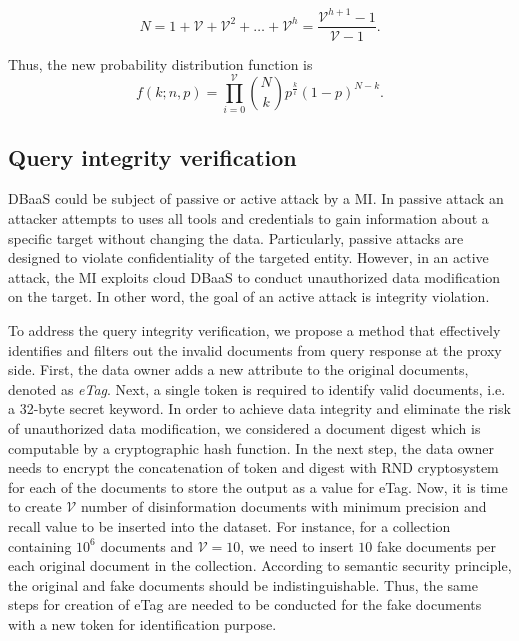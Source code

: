 \begin{equation}
\label{numberOfNodes}
N = 1+\mathcal{V}+ \mathcal{V}^2+ \dots + \mathcal{V}^h= \frac{\mathcal{V}^{h+1}-1}{\mathcal{V}-1}.
\end{equation}

Thus, the new probability distribution function is
\begin{equation}
\label{attibutesFromDilutedDB}
f(k;n,p) = \prod_{i=0}^{\mathcal{V}} {{N} \choose {k}}p^{\frac{k}{i}}(1-p)^{N-k}.
\end{equation}

\subsection{Query integrity verification}
\label{QueryintegrityVerificationSubSec}
DBaaS could be subject of passive or active attack by a MI. In passive attack an attacker attempts to uses all tools and credentials to gain information about a specific target without changing the data. Particularly, passive attacks are designed to violate confidentiality of the targeted entity. However, in an active attack, the MI exploits cloud DBaaS to conduct unauthorized data modification on the target. In other word, the goal of an active attack is integrity violation.

To address the query integrity verification, we propose a method that effectively identifies and filters out the invalid documents from query response at the proxy side. First, the data owner adds a new attribute to the original documents, denoted as \emph{eTag}. Next, a single token is required to identify valid documents, i.e. a 32-byte secret keyword. In order to achieve data integrity and eliminate the risk of unauthorized data modification, we considered a document digest which is computable by a cryptographic hash function. In the next step, the data owner needs to encrypt the concatenation of token and digest with RND cryptosystem for each of the documents to store the output as a value for eTag. Now, it is time to create $\mathcal{V}$ number of disinformation documents with minimum precision and recall value to be inserted into the dataset. For instance, for a collection containing $10^6$ documents and $\mathcal{V}=10$, we need to insert $10$ fake documents per each original document in the collection. According to semantic security principle, the original and fake documents should be indistinguishable. Thus, the same steps for creation of eTag are needed to be conducted for the fake documents with a new token for identification purpose.

